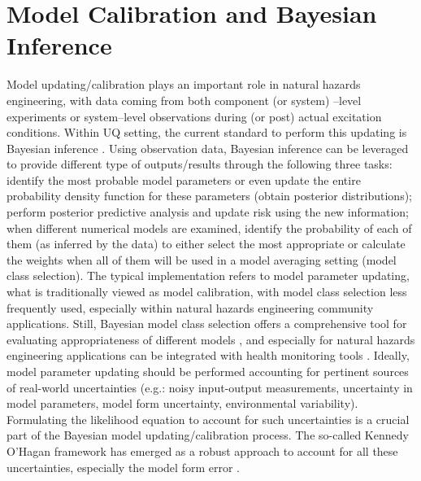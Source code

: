 \section{Model Calibration and Bayesian Inference}
\label{sec:uq_calibration}

Model updating/calibration plays an important role in natural hazards engineering, with data coming from both component (or system) –level experiments or system–level observations during (or post) actual excitation conditions. Within UQ setting, the current standard to perform this updating is Bayesian inference \citep{beck2010bayesian,kontoroupi2017online}. Using observation data, Bayesian inference can be leveraged to provide different type of outputs/results \citep{beck2013prior} through the following three tasks: identify the most probable model parameters or even update the entire probability density function for these parameters (obtain posterior distributions); perform posterior predictive analysis and update risk using the new information; when different numerical models are examined, identify the probability of each of them (as inferred by the data) to either select the most appropriate or calculate the weights when all of them will be used in a model averaging setting (model class selection). The typical implementation refers to model parameter updating, what is traditionally viewed as model calibration, with model class selection less frequently used, especially within natural hazards engineering community applications. Still, Bayesian model class selection offers a comprehensive tool for evaluating appropriateness of different models \citep{muto2008bayesian}, and especially for natural hazards engineering applications can be integrated with health monitoring tools \citep{oh2018bayesian}. Ideally, model parameter updating should be performed accounting for pertinent sources of real-world uncertainties (e.g.: noisy input-output measurements, uncertainty in model parameters, model form uncertainty, environmental variability). Formulating the likelihood equation to account for such uncertainties is a crucial part of the Bayesian model updating/calibration process. The so-called Kennedy O’Hagan framework has emerged as a robust approach to account for all these uncertainties, especially the model form error \citep{kennedy2001bayesian}. 

